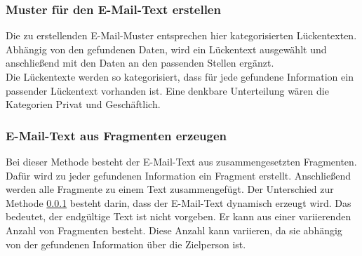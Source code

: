		\subsubsection{Muster für den E-Mail-Text erstellen}
		\label{subsubsec:EMailMusterMethode}
		Die zu erstellenden E-Mail-Muster entsprechen hier kategorisierten Lückentexten. Abhängig von den gefundenen Daten, wird ein Lückentext ausgewählt und anschließend mit den Daten an den passenden Stellen ergänzt.\\
		Die Lückentexte werden so kategorisiert, dass für jede gefundene Information ein passender Lückentext vorhanden ist. Eine denkbare Unterteilung wären die Kategorien Privat und Geschäftlich.
	
		\subsubsection{E-Mail-Text aus Fragmenten erzeugen}
		\label{subsubsec:EMailTextFragment}
		Bei dieser Methode besteht der E-Mail-Text aus zusammengesetzten Fragmenten. Dafür wird zu jeder gefundenen Information ein Fragment erstellt. Anschließend werden alle Fragmente zu einem Text zusammengefügt. Der Unterschied zur Methode \ref{subsubsec:EMailMusterMethode} besteht darin, dass der E-Mail-Text dynamisch erzeugt wird. Das bedeutet, der endgültige Text ist nicht vorgeben. Er kann aus einer variierenden Anzahl von Fragmenten besteht. Diese Anzahl kann variieren, da sie abhängig von der gefundenen Information über die Zielperson ist.
		
		
		
